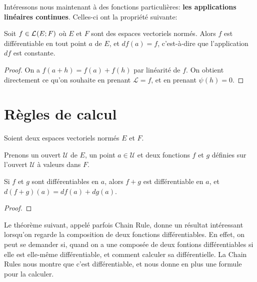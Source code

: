 Intéressons nous maintenant à des fonctions particulières: \textbf{les applications
linéaires continues}.
Celles-ci ont la propriété suivante:

\begin{proposition}
	Soit $f \in \mathcal{L}_{}(E; F)$ où $E$ et $F$ sont des espaces vectoriels
	normés. Alors $f$ est différentiable en tout point $a$ de $E$, et $df(a) =
	f$, c'est-à-dire que l'application $df$ est constante.
\end{proposition}

\ifdefined\outputproof
\begin{proof}
	On a $f(a + h) = f(a) + f(h)$ par linéarité de $f$.
	On obtient directement ce qu'on souhaite en prenant $\mathcal{L} = f$, et en
	prenant $\psi(h) = 0$.
\end{proof}
\fi

\section{Règles de calcul}


%

Soient deux espaces vectoriels normés $E$ et $F$.

Prenons un ouvert $\mathcal{U}$ de $E$, un point $a \in \mathcal{U}$ et deux
fonctions $f$ et $g$ définies sur l'ouvert $\mathcal{U}$ à valeurs dans $F$.

\begin{proposition}
	Si $f$ et $g$ sont différentiables en $a$, alors $f + g$ est différentiable
	en $a$, et $d(f + g)(a) = df(a) + dg(a)$.
\end{proposition}

\ifdefined\outputproof
\begin{proof}

\end{proof}
\fi

Le théorème suivant, appelé parfois Chain Rule, donne un résultat intéressant
lorsqu'on regarde la composition de deux fonctions différentiables. En effet, on
peut se demander si, quand on a une composée de deux fontions différentiables
si elle est elle-même différentiable, et comment calculer sa différentielle. La
Chain Rules nous montre que c'est différentiable, et nous donne en plus une
formule pour la calculer.

